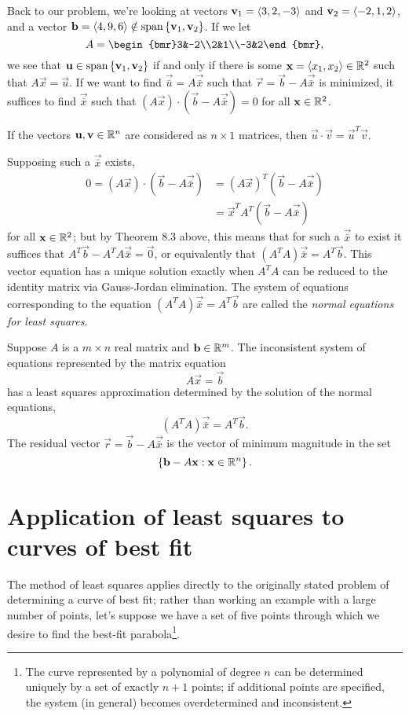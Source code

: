 \documentclass[m3380-lec-main.tex]{subfiles}
\begin{document}
Back to our problem, we're looking at vectors $\mathbf{v}_1 = \left\langle3,2,-3\right\rangle$ and $\mathbf{v}_2=\left\langle-2,1,2\right\rangle$, and a vector $\mathbf{b}=\left\langle4,9,6\right\rangle\notin\operatorname{span}\left\{\mathbf{v}_1,\mathbf{v}_2\right\}$. If we let 
\[A = \begin{bmr}3&-2\\2&1\\-3&2\end{bmr},\]
we see that $\mathbf{u}\in\operatorname{span}\left\{\mathbf{v}_1,\mathbf{v}_2\right\}$ if and only if there is some $\mathbf{x}=\left\langle x_1,x_2\right\rangle\in\mathbb{R}^2$ such that $A\vec{x}=\vec{u}$. If we want to find $\vec{\bar{u}}=A\vec{\bar{x}}$ such that $\vec{r}=\vec{b}-A\vec{\bar{x}}$ is minimized, it suffices to find $\vec{\bar{x}}$ such that $(A\vec{x})\cdot(\vec{b}-A\vec{\bar{x}})=0$ for all $\mathbf{x}\in\mathbb{R}^2$.

\begin{lem} If the vectors $\mathbf{u},\mathbf{v}\in\mathbb{R}^n$ are considered as $n\times 1$ matrices, then $\vec{u}\cdot\vec{v}=\vec{u}^T\vec{v}$.
\end{lem}

Supposing such a $\vec{\bar{x}}$ exists, 
\begin{align*}
0 = (A\vec{x})\cdot(\vec{b}-A\vec{\bar{x}}) &= (A\vec{x})^T(\vec{b}-A\vec{\bar{x}}) \\
	&= \vec{x}^TA^T(\vec{b}-A\vec{\bar{x}})
\end{align*}
for all $\mathbf{x}\in\mathbb{R}^2$; but by Theorem 8.3 above, this means that for such a $\vec{\bar{x}}$ to exist it suffices that $A^T\vec{b}-A^TA\vec{\bar{x}}=\vec{0}$, or equivalently that $(A^TA)\vec{\bar{x}} = A^T\vec{b}$. This vector equation has a unique solution exactly when $A^TA$ can be reduced to the identity matrix via Gauss-Jordan elimination. The system of equations corresponding to the equation $(A^TA)\vec{\bar{x}} = A^T\vec{b}$ are called the \emph{normal equations for least squares}.
\begin{thm} Suppose $A$ is a $m\times n$ real matrix and $\mathbf{b}\in\mathbb{R}^m$. The inconsistent system of equations represented by the matrix equation
\[A\vec{x}=\vec{b}\] has a least squares approximation determined by the solution of the normal equations,
\[(A^TA)\vec{\bar{x}}=A^T\vec{b}.\] The residual vector $\vec{r}=\vec{b}-A\vec{\bar{x}}$ is the vector of minimum magnitude in the set \[\left\{\mathbf{b}-A\mathbf{x}:\mathbf{x}\in\mathbb{R}^n\right\}.\]
\end{thm}

\section{Application of least squares to curves of best fit} 
The method of least squares applies directly to the originally stated problem of determining a curve of best fit; rather than working an example with a large number of points, let's suppose we have a set of five points through which we desire to find the best-fit parabola\footnote{The curve represented by a polynomial of degree $n$ can be determined uniquely by a set of exactly $n+1$ points; if additional points are specified, the system (in general) becomes overdetermined and inconsistent.}.
\end{document}
